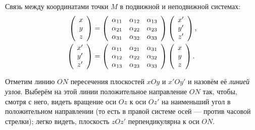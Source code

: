 Связь между координатами точки $M$ в подвижной и неподвижной системах:
\begin{equation}
  \label{eq:coords_transform}
  \begin{aligned}
    \left(
    \begin{array}{c}
      x \\
      y \\
      z \\
    \end{array}
    \right)
    &=
    \left(
    \begin{array}{c c c}
      \alpha_{11} & \alpha_{12} & \alpha_{13} \\
      \alpha_{21} & \alpha_{22} & \alpha_{23} \\
      \alpha_{31} & \alpha_{32} & \alpha_{33}
    \end{array}
    \right)
    \left(
    \begin{array}{c}
      x' \\
      y' \\
      z' \\
    \end{array}
    \right), \\
    \left(
    \begin{array}{c}
      x' \\
      y' \\
      z' \\
    \end{array}
    \right)
    &=
    \left(
    \begin{array}{c c c}
      \alpha_{11} & \alpha_{21} & \alpha_{31} \\
      \alpha_{12} & \alpha_{22} & \alpha_{32} \\
      \alpha_{13} & \alpha_{23} & \alpha_{33}
    \end{array}
    \right)
    \left(
    \begin{array}{c}
      x \\
      y \\
      z \\
    \end{array}
    \right).
  \end{aligned}
\end{equation}

Отметим линию $ON$ пересечения плоскостей $xOy$ и $x'Oy'$ и назовём её
\textit{линией узлов}. Выберём на этой линии положительное направление $ON$ так,
чтобы, смотря с него, видеть вращение оси $Oz$ к оси $Oz'$ на наименьший угол в
положительном направлении (то есть в правой системе осей --- против часовой
стрелки); легко видеть, плоскость $zOz'$ перпендикулярна к оси $ON$.

